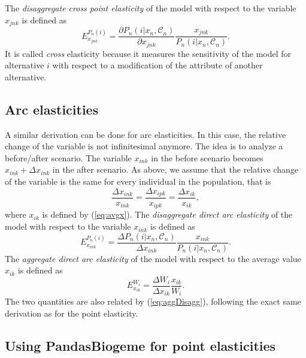 \documentclass[12pt,a4paper]{article}
\newcommand{\req}[1]{(\ref{#1})}
\newcommand{\C}{\mathcal{C}}
\begin{document}
The \emph{disaggregate cross point elasticity} of the model with respect to
the variable $x_{jnk}$ is defined as
\begin{equation}
\label{eq:disagCrossElasticity}
  E_{x_{jnk}}^{P_n(i)} = \frac{\partial P_n(i|x_n, \C_n)}{\partial
  x_{jnk}} \frac{x_{jnk}}{P_n(i|x_n, \C_n)}.
\end{equation}
It is called \emph{cross} elasticity because it measures the sensitivity
of the model for alternative $i$ with respect to a  modification of
the attribute of another alternative.



\subsection{Arc elasticities}

A similar derivation can be done for arc elasticities. In this case, 
the relative change of the variable is not infinitesimal anymore. The
idea is to analyze a before/after scenario. The variable $x_{ink}$ in
the before scenario becomes $x_{ink} + \Delta x_{ink}$ in the after scenario.
As above,  we assume that the relative change of
the variable is the same for every individual in the population,  that
is
\begin{equation}
  \label{eq:uniformChangeArc}
\frac{\Delta x_{ink}}{x_{ink}} = \frac{\Delta x_{ipk}}{x_{ipk}} = 
\frac{\Delta x_{ik}}{x_{ik}}, 
\end{equation}
where $x_{ik}$ is defined by \req{eq:avgx}.
The \emph{disaggregate direct arc elasticity} of the model with respect to
the variable $x_{ink}$ is defined as
\begin{equation}
\label{eq:disagElasticityArc}
  E_{x_{ink}}^{P_n(i)} = \frac{\Delta P_n(i|x_n, \C_n)}{\Delta
  x_{ink}} \frac{x_{ink}}{P_n(i|x_n, \C_n)}.
\end{equation}
The \emph{aggregate direct arc elasticity} of the model with
respect to the average value $x_{ik}$ is defined as
\begin{equation}
E_{x_{ik}}^{W_i} = \frac{\Delta W_i}{\Delta x_{ik}} \frac{x_{ik}}{W_i}.
\end{equation}
The two quantities are also related by \req{eq:aggDisagg},  following
the exact same derivation as for the point elasticity.

\subsection{Using PandasBiogeme for point elasticities}
\end{document}
